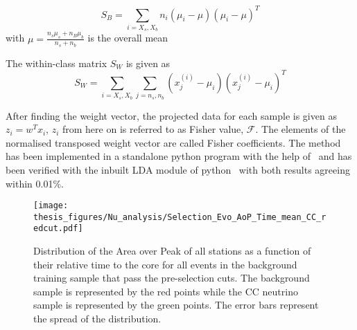 \begin{equation}
  S_{B} = \sum_{i = X_s,X_b} n_i (\mu_i - \mu)(\mu_i - \mu)^T
\end{equation}
with $\mu = \frac{n_s \mu_s + n_B \mu_b}{n_s + n_b}$ is the overall mean 

The within-class matrix $S_{W}$ is given as
\begin{equation}
  S_{W} = \sum_{i = X_s,X_b} \sum_{j = n_s,n_b } (x^{(i)}_j - \mu_i) (x^{(i)}_j - \mu_i)^T
\end{equation}

After finding the weight vector, the projected data for each sample is given as $z_i = w^Tx_i$, $z_i$ from here on is referred to as Fisher value, $\mathcal{F}$. The elements of the normalised transposed weight vector are called Fisher coefficients. The method has been implemented in a standalone python program with the help of~\cite{JaimeAlvarezMuniz_conversation} and has been verified with the inbuilt LDA module of python~\cite{scikit_Learn} with both results agreeing within 0.01\%. 

\begin{figure}[h!]
  \centering
  \texttt{[image: thesis\_figures/Nu\_analysis/Selection\_Evo\_AoP\_Time\_mean\_CC\_redcut.pdf]}
  \caption{Distribution of the Area over Peak of all stations as a function of their relative time to the core for all events in the background training sample that pass the pre-selection cuts. The background sample is represented by the red points while the CC neutrino sample is represented by the green points. The error bars represent the spread of the distribution.}
  \label{fig:Time_to_core}
\end{figure}

